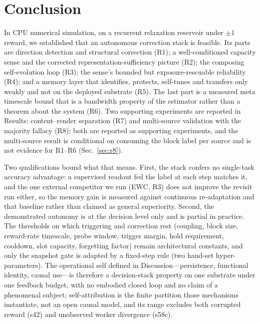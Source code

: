 \documentclass[preprint,12pt]{elsarticle}
\begin{document}
\section{Conclusion}
\label{sec:concl}

In CPU numerical simulation, on a recurrent relaxation reservoir under
$\pm1$ reward, we established that an autonomous correction stack is
feasible. Its parts are direction
detection and structural correction (R1); a well-conditioned capacity sense
and the corrected representation-sufficiency picture (R2); the composing
self-evolution loop (R3); the sense's bounded but exposure-rescuable
reliability (R4); and a memory layer that identifies, protects, self-tunes and
transfers only weakly and not on the deployed substrate (R5). The last part is
a measured
meta timescale bound that is a bandwidth property of the estimator rather than
a theorem about the system (R6). Two supporting experiments are reported in
Results: content--render separation (R7) and multi-source validation with the
majority fallacy (R8); both are reported as supporting experiments, and the
multi-source result is conditional on consuming the block label per source
and is not evidence for R1--R6 (Sec.~\ref{sec:r8}).

Two qualifications bound what that means. First, the stack confers no
single-task accuracy advantage: a supervised readout fed the label at each
step matches it, and the one external competitor we run (EWC, R3) does not
improve the revisit run either, so the memory gain is measured against
continuous re-adaptation and that baseline rather than claimed as general
superiority. Second, the demonstrated autonomy is at the decision level
only and is partial in practice. The thresholds on which triggering and
correction rest (coupling, block size, reward-rate timescale, probe window,
trigger margin, hold requirement, cooldown, slot capacity, forgetting
factor) remain architectural constants, and only the snapshot gate is
adapted by a fixed-step rule (two hand-set hyper-parameters). The
operational self defined in Discussion---persistence, functional identity,
causal use---is therefore a decision-stack property on one substrate under
one feedback budget, with no embodied closed loop and no claim of a
phenomenal subject; self-attribution is the finite partition those
mechanisms instantiate, not an open causal model, and its range excludes
both corrupted reward (s42) and unobserved worker divergence (s58c).
\end{document}
